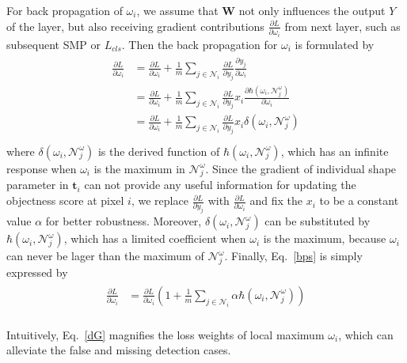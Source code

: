 For back propagation of $\omega_i$, we assume that $\mathbf{W}$ not only influences the output $Y$ of the layer, but also receiving gradient contributions $\frac{\partial L}{\partial \omega_{i}}$ from next layer, such as subsequent SMP or $L_{cls}$.
Then the back propagation for $\omega_{i}$ is formulated by
%
\begin{eqnarray}\label{bps}
\begin{aligned}
\frac{\partial L}{\partial \omega_{i}}&=\frac{\partial L}{\partial \omega_{i}}+\frac{1}{m}\sum_{j\in\mathcal{N}_{i}}\frac{\partial L}{\partial y_{j}}\frac{\partial y_{j}}{\partial \omega_{i}}\\
&=\frac{\partial L}{\partial \omega_{i}}+\frac{1}{m}\sum_{j\in\mathcal{N}_{i}}\frac{\partial L}{\partial y_{j}}x_{i}\frac{\partial \hbar(\omega_{i},\mathcal{N}^{\omega}_{j})}{\partial \omega_{i}}\\
&=\frac{\partial L}{\partial \omega_{i}}+\frac{1}{m}\sum_{j\in\mathcal{N}_{i}}\frac{\partial L}{\partial y_{j}}x_{i}\delta(\omega_{i},\mathcal{N}^{\omega}_{j})\\
\end{aligned}
\end{eqnarray}
where $\delta(\omega_{i},\mathcal{N}^{\omega}_{j})$ is the derived function of $\hbar(\omega_{i},\mathcal{N}^{\omega}_{j})$, which has an infinite response when $\omega_{i}$ is the maximum in $\mathcal{N}^{\omega}_{j}$.
Since the gradient of individual shape parameter in $\mathbf{t}_i$ can not provide any useful information for updating the objectness score at pixel $i$, we replace $\frac{\partial L}{\partial y_{j}}$ with $\frac{\partial L}{\partial \omega_{i}}$ and fix the $x_i$ to be a constant value $\alpha$ for better robustness.
Moreover, $\delta(\omega_{i},\mathcal{N}^{\omega}_{j})$ can be substituted by $\hbar(\omega_{i},\mathcal{N}^{\omega}_{j})$, which has a limited coefficient when $\omega_{i}$ is the maximum, because $\omega_i$ can never be lager than the maximum of $\mathcal{N}^{\omega}_{j}$.
Finally, Eq.~\ref{bps} is simply expressed by
\begin{eqnarray}\label{dG}
\begin{aligned}
\frac{\partial L}{\partial \omega_{i}}&=\frac{\partial L}{\partial \omega_{i}}(1+\frac{1}{m}\sum_{j\in\mathcal{N}_{i}}\alpha \hbar(\omega_{i},\mathcal{N}^{\omega}_{j}))\\
\end{aligned}
\end{eqnarray}

Intuitively, Eq.~\ref{dG} magnifies the loss weights of local maximum $\omega_{i}$, which can alleviate the false and missing detection cases.

